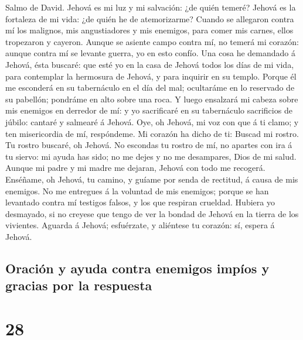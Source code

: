  Salmo de David. Jehová es mi luz y mi salvación: ¿de
quién temeré? Jehová es la fortaleza de mi vida: ¿de quién he de
atemorizarme?  Cuando se allegaron contra mí los malignos,
mis angustiadores y mis enemigos, para comer mis carnes, ellos
tropezaron y cayeron.  Aunque se asiente campo contra mí,
no temerá mi corazón: aunque contra mí se levante guerra, yo en esto
confío.  Una cosa he demandado á Jehová, ésta buscaré: que
esté yo en la casa de Jehová todos los días de mi vida, para contemplar
la hermosura de Jehová, y para inquirir en su templo. 
Porque él me esconderá en su tabernáculo en el día del mal; ocultaráme
en lo reservado de su pabellón; pondráme en alto sobre una roca.
 Y luego ensalzará mi cabeza sobre mis enemigos en
derredor de mí: y yo sacrificaré en su tabernáculo sacrificios de
júbilo: cantaré y salmearé á Jehová.  Oye, oh Jehová, mi
voz con que á ti clamo; y ten misericordia de mí, respóndeme.
 Mi corazón ha dicho de ti: Buscad mi rostro. Tu rostro
buscaré, oh Jehová.  No escondas tu rostro de mí, no
apartes con ira á tu siervo: mi ayuda has sido; no me dejes y no me
desampares, Dios de mi salud.  Aunque mi padre y mi madre
me dejaran, Jehová con todo me recogerá.  Enséñame, oh
Jehová, tu camino, y guíame por senda de rectitud, á causa de mis
enemigos.  No me entregues á la voluntad de mis enemigos;
porque se han levantado contra mí testigos falsos, y los que respiran
crueldad.  Hubiera yo desmayado, si no creyese que tengo
de ver la bondad de Jehová en la tierra de los vivientes.
 Aguarda á Jehová; esfuérzate, y aliéntese tu corazón:
sí, espera á Jehová.

\hypertarget{oraciuxf3n-y-ayuda-contra-enemigos-impuxedos-y-gracias-por-la-respuesta}{%
\subsection{Oración y ayuda contra enemigos impíos y gracias por la
respuesta}\label{oraciuxf3n-y-ayuda-contra-enemigos-impuxedos-y-gracias-por-la-respuesta}}

\hypertarget{section-27}{%
\section{28}\label{section-27}}

